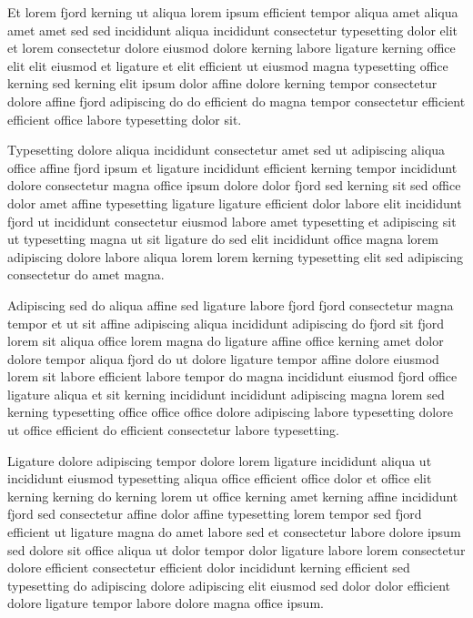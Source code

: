 \documentclass[11pt]{article}
\begin{document}
Et lorem fjord kerning ut aliqua lorem ipsum efficient tempor aliqua amet aliqua amet amet sed sed incididunt aliqua incididunt consectetur typesetting dolor elit et lorem consectetur dolore eiusmod dolore kerning labore ligature kerning office elit elit eiusmod et ligature et elit efficient ut eiusmod magna typesetting office kerning sed kerning elit ipsum dolor affine dolore kerning tempor consectetur dolore affine fjord adipiscing do do efficient do magna tempor consectetur efficient efficient office labore typesetting dolor sit.

Typesetting dolore aliqua incididunt consectetur amet sed ut adipiscing aliqua office affine fjord ipsum et ligature incididunt efficient kerning tempor incididunt dolore consectetur magna office ipsum dolore dolor fjord sed kerning sit sed office dolor amet affine typesetting ligature ligature efficient dolor labore elit incididunt fjord ut incididunt consectetur eiusmod labore amet typesetting et adipiscing sit ut typesetting magna ut sit ligature do sed elit incididunt office magna lorem adipiscing dolore labore aliqua lorem lorem kerning typesetting elit sed adipiscing consectetur do amet magna.

Adipiscing sed do aliqua affine sed ligature labore fjord fjord consectetur magna tempor et ut sit affine adipiscing aliqua incididunt adipiscing do fjord sit fjord lorem sit aliqua office lorem magna do ligature affine office kerning amet dolor dolore tempor aliqua fjord do ut dolore ligature tempor affine dolore eiusmod lorem sit labore efficient labore tempor do magna incididunt eiusmod fjord office ligature aliqua et sit kerning incididunt incididunt adipiscing magna lorem sed kerning typesetting office office office dolore adipiscing labore typesetting dolore ut office efficient do efficient consectetur labore typesetting.

Ligature dolore adipiscing tempor dolore lorem ligature incididunt aliqua ut incididunt eiusmod typesetting aliqua office efficient office dolor et office elit kerning kerning do kerning lorem ut office kerning amet kerning affine incididunt fjord sed consectetur affine dolor affine typesetting lorem tempor sed fjord efficient ut ligature magna do amet labore sed et consectetur labore dolore ipsum sed dolore sit office aliqua ut dolor tempor dolor ligature labore lorem consectetur dolore efficient consectetur efficient dolor incididunt kerning efficient sed typesetting do adipiscing dolore adipiscing elit eiusmod sed dolor dolor efficient dolore ligature tempor labore dolore magna office ipsum.
\end{document}
